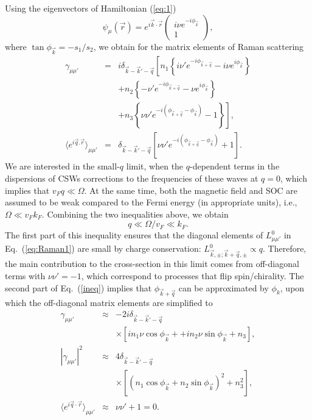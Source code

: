 \documentclass[prb,aps,twocolumn]{revtex4}
\newcommand{\beq}{\begin{equation}}
\newcommand{\eeq}{\end{equation}}
\newcommand{\bea}{\begin{eqnarray}}
\newcommand{\eea}{\end{eqnarray}}
\newcommand{\bk}{{\vec k}}
\newcommand{\bq}{{\vec q}}
\newcommand{\nn}{\nonumber}
\begin{document}
Using the eigenvectors of Hamiltonian (\ref{eq:1})
\beq\label{eq:33} \psi_{\mu}(\vec r)=e^{i\bk\cdot\vec r}\left(
\begin{array}{c}
i\nu e^{-i\phi_\bk}\\1
\end{array}
\right), \eeq where $\tan\phi_\bk=-s_1/s_2$, we obtain for the
matrix elements of Raman scattering
\bea\label{eq:gamma} \gamma_{\mu\mu'}&=&i\delta_{\bk-\bk'-\bq}
\left[n_1\left\{i\nu'e^{-i\phi_{\bk+\bq}}-i\nu
e^{i\phi_{\bk}}\right\}\right.\nonumber\\
&&+ n_2\left\{-\nu'e^{-i\phi_{\bk+\bq}}-\nu
e^{i\phi_{\bk}}\right\}\nonumber\\
&&\left.+ n_3\left\{\nu\nu'
e^{-i(\phi_{\bk+\bq}-\phi_\bk)}-1\right\}
\right],\nn\\
\langle e^{i\bq.\vec r}\rangle_{\mu\mu'}&=&\delta_{\bk-\bk'-\bq}
\left[\nu\nu' e^{-i(\phi_{\bk+\bq}-\phi_\bk)}+1\right]. \eea
We are interested in the small-$q$ limit, when the $q$-dependent
terms in the dispersions of CSWs corrections to the frequencies of
these waves at $q=0$, which implies that $v_Fq\ll \Omega$. At the
same time, both the magnetic field and SOC are assumed to be weak
compared to the Fermi energy (in appropriate units), i.e.,
$\Omega\ll v_Fk_F$. Combining the two inequalities above, we
obtain \beq q\ll \Omega/v_F\ll k_F. \label{ineq} \eeq The first
part of this inequality ensures that the diagonal elements of
$L^0_{\mu\mu'}$ in Eq.~(\ref{eq:Raman1}) are small by charge
conservation: $L^0_{\bk,\pm;\bk+\bq,\pm}\propto q$. Therefore, the
main contribution to the cross-section in this limit comes from
off-diagonal terms with $\nu\nu'=-1$, which correspond to
processes that flip spin/chirality. The second part of
Eq.~(\ref{ineq}) implies that $\phi_{\bk+\bq}$ can be approximated
by $\phi_{k}$, upon which the off-diagonal matrix elements are
simplified to
\begin{subequations}
\bea \gamma_{\mu\mu'}&\approx&-2i\delta_{\bk-\bk'-\bq}\nonumber\\
&&\times\left[in_1\nu\cos\phi_\bk+ +in_2\nu\sin\phi_\bk+ n_3
\right],\\
|\gamma_{\mu\mu'}|^2&\approx& 4\delta_{\bk-\bk'-\bq} \nonumber\\
&&\times\left[(n_1\cos\phi_\bk+n_2\sin\phi_\bk)^2+n_3^2\right],\\
\langle e^{i\bq\cdot\vec
r}\rangle_{\mu\mu'}&\approx&\nu\nu'+1=0.\label{eq:gamm2}\eea
\end{subequations}
\end{document}
